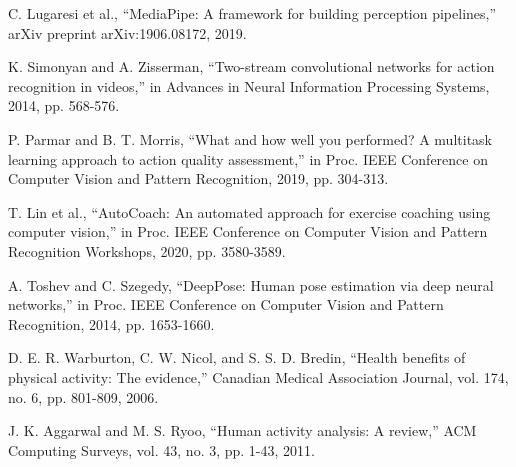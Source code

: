 \documentclass[11pt]{article}
\begin{document}
\begin{thebibliography}{16}
 C. Lugaresi et al., ``MediaPipe: A framework for building perception pipelines,'' arXiv preprint arXiv:1906.08172, 2019.

 K. Simonyan and A. Zisserman, ``Two-stream convolutional networks for action recognition in videos,'' in Advances in Neural Information Processing Systems, 2014, pp. 568-576.

 P. Parmar and B. T. Morris, ``What and how well you performed? A multitask learning approach to action quality assessment,'' in Proc. IEEE Conference on Computer Vision and Pattern Recognition, 2019, pp. 304-313.

 T. Lin et al., ``AutoCoach: An automated approach for exercise coaching using computer vision,'' in Proc. IEEE Conference on Computer Vision and Pattern Recognition Workshops, 2020, pp. 3580-3589.

 A. Toshev and C. Szegedy, ``DeepPose: Human pose estimation via deep neural networks,'' in Proc. IEEE Conference on Computer Vision and Pattern Recognition, 2014, pp. 1653-1660.

 D. E. R. Warburton, C. W. Nicol, and S. S. D. Bredin, ``Health benefits of physical activity: The evidence,'' Canadian Medical Association Journal, vol. 174, no. 6, pp. 801-809, 2006.

 J. K. Aggarwal and M. S. Ryoo, ``Human activity analysis: A review,'' ACM Computing Surveys, vol. 43, no. 3, pp. 1-43, 2011.
\end{thebibliography}
\end{document}

